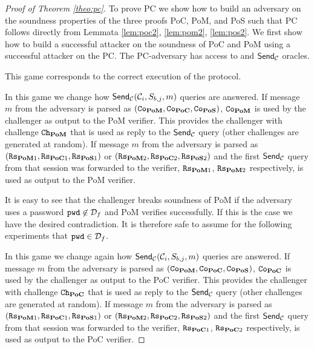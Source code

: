 
\begin{proof}[Proof of Theorem \ref{theo:pc}]
To prove \ac{PC} we show how to build an adversary on the soundness properties of the three proofs \ac{PoC}, \ac{PoM}, and \ac{PoS} such that \ac{PC} follows directly from Lemmata \ref{lem:poc2}, \ref{lem:pom2}, \ref{lem:pos2}.
We first show how to build a successful attacker on the soundness of \ac{PoC} and \ac{PoM} using a successful attacker on the \ac{PC}.
The \ac{PC}-adversary has access to \Setup and $\mathsf{Send}_\mathcal{C}$ oracles.

 This game corresponds to the correct execution of the protocol.

 In this game we change how $\mathsf{Send}_\mathcal{C}(\mathcal{C}_i, S_{b,j}, m)$ queries are answered.
If message $m$ from the adversary is parsed as $(\mathtt{Co}_\mathsf{\bf PoM},\mathtt{Co}_\mathsf{\bf PoC},\mathtt{Co}_\mathsf{\bf PoS})$, $\mathtt{Co}_\mathsf{\bf PoM}$ is used by the challenger as output to the \ac{PoM} verifier.
This provides the challenger with challenge $\mathtt{Ch}_\mathsf{\bf PoM}$ that is used as reply to the $\mathsf{Send}_\mathcal{C}$ query (other challenges are generated at random).
If message $m$ from the adversary is parsed as $(\mathtt{Rs}_{\mathsf{\bf PoM}1},\mathtt{Rs}_{\mathsf{\bf PoC}1},\mathtt{Rs}_{\mathsf{\bf PoS}1})$ or $(\mathtt{Rs}_{\mathsf{\bf PoM}2},\mathtt{Rs}_{\mathsf{\bf PoC}2},\mathtt{Rs}_{\mathsf{\bf PoS}2})$ and the first $\mathsf{Send}_\mathcal{C}$ query from that session was forwarded to the verifier, $\mathtt{Rs}_{\mathsf{\bf PoM}1}$, $\mathtt{Rs}_{\mathsf{\bf PoM}2}$ respectively, is used as output to the \ac{PoM} verifier.

It is easy to see that the challenger breaks soundness of \ac{PoM} if the adversary uses a password $\mathtt{pwd}\not\in\mathcal{D}_f$ and \ac{PoM} verifies successfully.
If this is the case we have the desired contradiction.
It is therefore safe to assume for the following experiments that $\mathtt{pwd}\in\mathcal{D}_f$.

In this game we change again how $\mathsf{Send}_\mathcal{C}(\mathcal{C}_i, S_{b,j}, m)$ queries are answered.
If message $m$ from the adversary is parsed as $(\mathtt{Co}_\mathsf{\bf PoM},\mathtt{Co}_\mathsf{\bf PoC},\mathtt{Co}_\mathsf{\bf PoS})$, $\mathtt{Co}_\mathsf{\bf PoC}$ is used by the challenger as output to the \ac{PoC} verifier.
This provides the challenger with challenge $\mathtt{Ch}_\mathsf{\bf PoC}$ that is used as reply to the $\mathsf{Send}_\mathcal{C}$ query (other challenges are generated at random).
If message $m$ from the adversary is parsed as $(\mathtt{Rs}_{\mathsf{\bf PoM}1},\mathtt{Rs}_{\mathsf{\bf PoC}1},\mathtt{Rs}_{\mathsf{\bf PoS}1})$ or $(\mathtt{Rs}_{\mathsf{\bf PoM}2},\mathtt{Rs}_{\mathsf{\bf PoC}2},\mathtt{Rs}_{\mathsf{\bf PoS}2})$ and the first $\mathsf{Send}_\mathcal{C}$ query from that session was forwarded to the verifier, $\mathtt{Rs}_{\mathsf{\bf PoC}1}$, $\mathtt{Rs}_{\mathsf{\bf PoC}2}$ respectively, is used as output to the \ac{PoC} verifier.


\end{proof}
